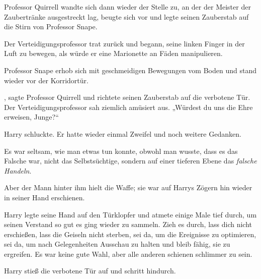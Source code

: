 Professor Quirrell wandte sich dann wieder der Stelle zu, an der der Meister der Zaubertränke ausgestreckt lag, beugte sich vor und legte seinen Zauberstab auf die Stirn von Professor Snape. 

Der Verteidigungsprofessor trat zurück und begann, seine linken Finger in der Luft zu bewegen, als würde er eine Marionette an Fäden manipulieren.

Professor Snape erhob sich mit geschmeidigen Bewegungen vom Boden und stand wieder vor der Korridortür.

, sagte Professor Quirrell und richtete seinen Zauberstab auf die verbotene Tür.
Der Verteidigungsprofessor sah ziemlich amüsiert aus.
„Würdest du uns die Ehre erweisen, Junge?“

Harry schluckte. Er hatte wieder einmal Zweifel und noch weitere Gedanken.

Es war seltsam, wie man etwas tun konnte, obwohl man wusste, dass es das Falsche war, nicht das Selbstsüchtige, sondern auf einer tieferen Ebene das \emph{falsche Handeln}.

Aber der Mann hinter ihm hielt die Waffe; sie war auf Harrys Zögern hin wieder in seiner Hand erschienen.

Harry legte seine Hand auf den Türklopfer und atmete einige Male tief durch, um seinen Verstand so gut es ging wieder zu sammeln.
Zieh es durch, lass dich nicht erschießen, lass die Geiseln nicht sterben, sei da, um die Ereignisse zu optimieren, sei da, um nach Gelegenheiten Ausschau zu halten und bleib fähig, sie zu ergreifen. Es war keine gute Wahl, aber alle anderen schienen schlimmer zu sein.

Harry stieß die verbotene Tür auf und schritt hindurch.

